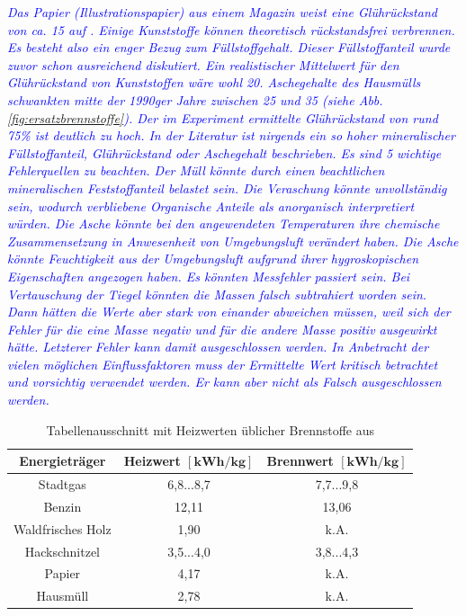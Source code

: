 \textcolor{blue}{\textit{Das Papier (Illustrationspapier) aus einem Magazin weist eine Glührückstand von ca. \SI{15}{\mpercent} auf \cite{roempppap}. Einige Kunststoffe können theoretisch rückstandsfrei verbrennen. Es besteht also ein enger Bezug zum Füllstoffgehalt. Dieser Füllstoffanteil wurde zuvor schon ausreichend diskutiert. Ein realistischer Mittelwert für den Glührückstand von Kunststoffen wäre wohl \SI{20}{\mpercent}.
Aschegehalte des Hausmülls schwankten mitte der 1990ger Jahre zwischen \SI{25}{\mpercent} und \SI{35}{\mpercent} (siehe Abb. \ref{fig:ersatzbrennstoffe}).
Der im Experiment ermittelte Glührückstand von rund 75\% ist deutlich zu hoch. In der Literatur ist nirgends ein so hoher mineralischer Füllstoffanteil, Glührückstand oder Aschegehalt beschrieben. Es sind 5 wichtige Fehlerquellen zu beachten. Der Müll könnte durch einen beachtlichen mineralischen Feststoffanteil belastet sein. Die Veraschung könnte unvollständig sein, wodurch verbliebene Organische Anteile als anorganisch interpretiert würden. Die Asche könnte bei den angewendeten Temperaturen ihre chemische Zusammensetzung in Anwesenheit von Umgebungsluft verändert haben. Die Asche könnte Feuchtigkeit aus der Umgebungsluft aufgrund ihrer hygroskopischen Eigenschaften angezogen haben. Es könnten Messfehler passiert sein. Bei Vertauschung der Tiegel könnten die Massen falsch subtrahiert worden sein. Dann hätten die Werte aber stark von einander abweichen müssen, weil sich der Fehler für die eine Masse negativ und für die andere Masse positiv ausgewirkt hätte. Letzterer Fehler kann damit ausgeschlossen werden. 
In Anbetracht der vielen möglichen Einflussfaktoren muss der Ermittelte Wert kritisch betrachtet und vorsichtig verwendet werden. Er kann aber nicht als Falsch ausgeschlossen werden.}}
\vspace*{-3.5mm}
\renewcommand{\arraystretch}{1.2}
\begin{table}[h!]
	\centering
	\caption[Tabellenausschnitt mit Heizwerten üblicher Brennstoffe]{Tabellenausschnitt mit Heizwerten üblicher Brennstoffe aus \cite{S.Furkus.}}
	\label{tab:heizwerte}
	\begin{tabulary}{\textwidth}{C|CC}
		\hline
		\textbf{Energieträger} & \textbf{Heizwert $\boldsymbol{\left[\si{\kWh\per\kg}\right]}$} & \textbf{Brennwert $\boldsymbol{\left[\si{\kWh\per\kg}\right]}$} \\ 
		\hline
		Stadtgas			&	6,8...8,7	&	7,7...9,8\\
		Benzin				&	12,11	&	13,06\\
		Waldfrisches Holz	&	1,90	&	k.A.\\
		Hackschnitzel		&	3,5...4,0	&	3,8...4,3\\
		Papier 				& 	4,17 	&	k.A. \\	
		Hausmüll			&	2,78	&	k.A.\\
		\hline
	\end{tabulary}
\end{table}
\FloatBarrier
\vspace*{-2.5mm}

